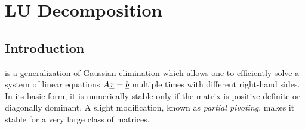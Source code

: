 \section{LU Decomposition}

\subsection{Introduction}

 is a generalization of Gaussian elimination which allows one to efficiently solve a system of linear equations $A \underline{x} = \underline{b}$ multiple times with different right-hand sides.
In its basic form, it is numerically stable only if the matrix is positive definite or diagonally dominant.
A slight modification, known as \emph{partial pivoting}, makes it stable for a very large class of matrices.

